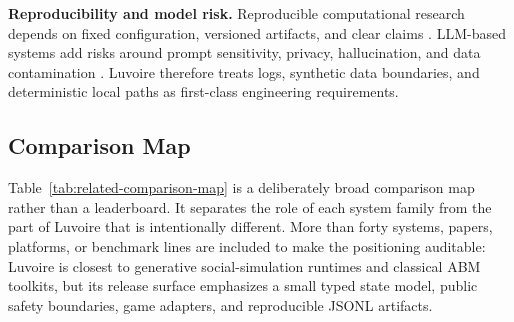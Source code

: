 \textbf{Reproducibility and model risk.} Reproducible computational research depends on fixed configuration, versioned artifacts, and clear claims \cite{sandve2013tenrules,wilkinson2016fair,peng2011reproducible,pineau2021improving}. LLM-based systems add risks around prompt sensitivity, privacy, hallucination, and data contamination \cite{bommasani2021foundation,weidinger2021ethical,bender2021stochastic,mitchell2019modelcards,gebru2021datasheets}. Luvoire therefore treats logs, synthetic data boundaries, and deterministic local paths as first-class engineering requirements.

\subsection{Comparison Map}

Table~\ref{tab:related-comparison-map} is a deliberately broad comparison map rather than a leaderboard. It separates the role of each system family from the part of Luvoire that is intentionally different. More than forty systems, papers, platforms, or benchmark lines are included to make the positioning auditable: Luvoire is closest to generative social-simulation runtimes and classical ABM toolkits, but its release surface emphasizes a small typed state model, public safety boundaries, game adapters, and reproducible JSONL artifacts.

